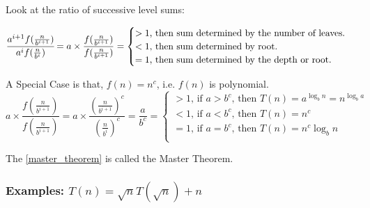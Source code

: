 Look at the ratio of successive level sums:

\begin{equation}
    \cfrac{a^{i+1}f(\frac{n}{b^{i+1}})}{a^if(\frac{n}{b^i})}
    = a \times \frac{f(\frac{n}{b^{i+1}})}{f(\frac{n}{b^{i+1}})}
    =
    \begin{cases}
        > 1 \text{, then sum determined by the number of leaves.}\\
        < 1 \text{, then sum determined by root.} \\
        = 1 \text{, then sum determined by the depth or root.}\\
    \end{cases}
\end{equation}

A Special Case is that, $f(n) = n^c$, i.e. $f(n)$ is polynomial.
\begin{equation}\label{master_theorem}
    a \times \frac{f(\frac{n}{b^{i+1}})}{f(\frac{n}{b^{i+1}})}
    = a \times \frac{(\frac{n}{b^{i+1}})^c}{(\frac{n}{b^i})^c}
    = \frac{a}{b^c}
    =
    \begin{cases}
        > 1\text{, if } a>b^c\text{, then } T(n) = a^{\log_b n} = n^{\log_b a}\\
        < 1\text{, if } a<b^c\text{, then } T(n) = n^c\\
        = 1\text{, if } a=b^c\text{, then } T(n) = n^c\log_b n \\
    \end{cases}
\end{equation}

The \cref{master_theorem} is called the Master Theorem.

\subsubsection{Examples: \texorpdfstring{$T(n)=\sqrt{n}T(\sqrt{n})+n$}{T(n)=sqrt(n)T(sqrt(n))+n}}

